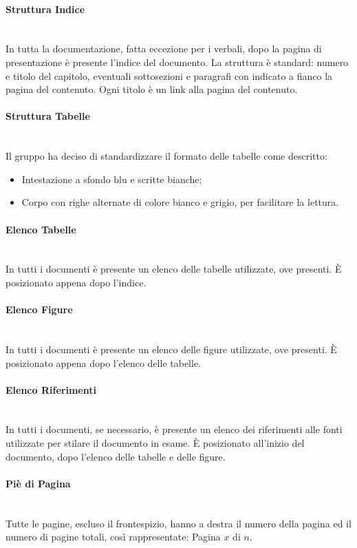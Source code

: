 \paragraph{Struttura Indice} \-\\
In tutta la documentazione, fatta eccezione per i verbali, dopo la pagina di presentazione è presente l'indice del documento. La struttura è standard: numero e titolo del capitolo, eventuali sottosezioni e paragrafi con indicato a fianco la pagina del contenuto. Ogni titolo è un link alla pagina del contenuto. 

\paragraph{Struttura Tabelle} \-\\
Il gruppo ha deciso di standardizzare il formato delle tabelle come descritto:
\begin{itemize}
	\item Intestazione a sfondo blu e scritte bianche;
	\item Corpo con righe alternate di colore bianco e grigio, per facilitare la lettura.
\end{itemize}

\paragraph{Elenco Tabelle} \-\\
In tutti i documenti è presente un elenco delle tabelle utilizzate, ove presenti. È posizionato appena dopo l'indice.  

\paragraph{Elenco Figure} \-\\
In tutti i documenti è presente un elenco delle figure utilizzate, ove presenti. È posizionato appena dopo l'elenco delle tabelle.

\paragraph{Elenco Riferimenti} \-\\
In tutti i documenti, se necessario, è presente un elenco dei riferimenti alle fonti utilizzate per stilare il documento in esame. È posizionato all'inizio del documento, dopo l'elenco delle tabelle e delle figure.

\paragraph{Piè di Pagina} \-\\ 
Tutte le pagine, escluso il frontespizio, hanno a destra il numero della pagina ed il numero di pagine totali, così rappresentate: Pagina $x$ di $n$.

